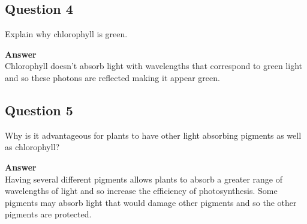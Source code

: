 \documentclass{article}
\begin{document}
\subsection*{Question 4}
Explain why chlorophyll is green.

\textbf{Answer}\\
Chlorophyll doesn't absorb light with wavelengths that correspond to green light and so these photons are reflected making it appear green.

\subsection*{Question 5}
Why is it advantageous for plants to have other light absorbing pigments as well as chlorophyll?

\textbf{Answer}\\
Having several different pigments allows plants to absorb a greater range of wavelengths of light and so increase the efficiency of photosynthesis. Some pigments may absorb light that would damage other pigments and so the other pigments are protected.
\end{document}
